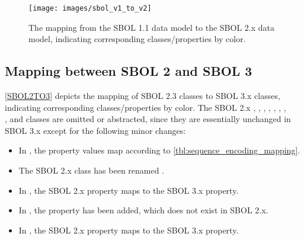 \begin{figure}[htp]
\begin{center}
  \texttt{[image: images/sbol\_v1\_to\_v2]}
\end{center}
\caption{\label{SBOL1TO2}The mapping from the SBOL 1.1 data model to the SBOL 2.x  data model, indicating corresponding classes/properties by color.}
\end{figure}



\subsection{Mapping between SBOL 2 and SBOL 3}

\ref{SBOL2TO3} depicts the mapping of SBOL 2.3 classes to SBOL 3.x classes, indicating corresponding classes/properties by color.   
The SBOL 2.x , , , , , , , \\
, and  classes are omitted or abstracted, since they are essentially unchanged in SBOL 3.x except for the following minor changes:
\begin{itemize}
\item In , the  property values map according to  \ref{tbl:sequence_encoding_mapping}. 
\item The SBOL 2.x  class has been renamed .
\item In , the SBOL 2.x  property maps to the SBOL 3.x  property.
\item In , the  property has been added, which does not exist in SBOL 2.x.
\item In , the SBOL 2.x  property maps to the SBOL 3.x  property.
\end{itemize}

